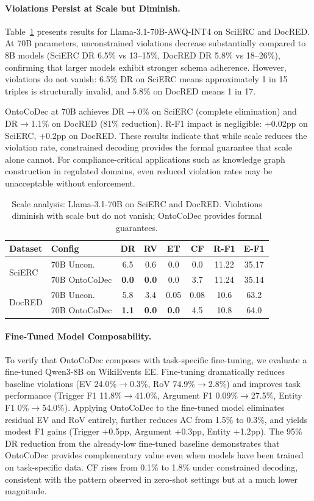 \documentclass[11pt,a4paper]{article}
\newcommand{\sys}{OntoCoDec}
\newcommand{\bfval}[1]{\textbf{#1}}
\begin{document}
\paragraph{Violations Persist at Scale but Diminish.}
Table~\ref{tab:70b} presents results for Llama-3.1-70B-AWQ-INT4 on SciERC and DocRED. At 70B parameters, unconstrained violations decrease substantially compared to 8B models (SciERC DR 6.5\% vs 13--15\%, DocRED DR 5.8\% vs 18--26\%), confirming that larger models exhibit stronger schema adherence. However, violations do not vanish: 6.5\% DR on SciERC means approximately 1 in 15 triples is structurally invalid, and 5.8\% on DocRED means 1 in 17.

\sys{} at 70B achieves DR$\to$0\% on SciERC (complete elimination) and DR$\to$1.1\% on DocRED (81\% reduction). R-F1 impact is negligible: +0.02pp on SciERC, +0.2pp on DocRED. These results indicate that while scale reduces the violation rate, constrained decoding provides the formal guarantee that scale alone cannot. For compliance-critical applications such as knowledge graph construction in regulated domains, even reduced violation rates may be unacceptable without enforcement.

\begin{table}[t]
\centering
\small
\caption{Scale analysis: Llama-3.1-70B on SciERC and DocRED. Violations diminish with scale but do not vanish; \sys{} provides formal guarantees.}
\label{tab:70b}
\begin{tabular}{llcccccc}
\toprule
Dataset & Config & DR & RV & ET & CF & R-F1 & E-F1 \\
\midrule
\multirow{2}{*}{SciERC} & 70B Uncon. & 6.5 & 0.6 & 0.0 & 0.0 & 11.22 & 35.17 \\
& 70B \sys{} & \bfval{0.0} & \bfval{0.0} & 0.0 & 3.7 & 11.24 & 35.14 \\
\midrule
\multirow{2}{*}{DocRED} & 70B Uncon. & 5.8 & 3.4 & 0.05 & 0.08 & 10.6 & 63.2 \\
& 70B \sys{} & \bfval{1.1} & \bfval{0.0} & \bfval{0.0} & 4.5 & 10.8 & 64.0 \\
\bottomrule
\end{tabular}
\end{table}

\paragraph{Fine-Tuned Model Composability.}
To verify that \sys{} composes with task-specific fine-tuning, we evaluate a fine-tuned Qwen3-8B on WikiEvents EE. Fine-tuning dramatically reduces baseline violations (EV 24.0\%$\to$0.3\%, RoV 74.9\%$\to$2.8\%) and improves task performance (Trigger F1 11.8\%$\to$41.0\%, Argument F1 0.09\%$\to$27.5\%, Entity F1 0\%$\to$54.0\%). Applying \sys{} to the fine-tuned model eliminates residual EV and RoV entirely, further reduces AC from 1.5\% to 0.3\%, and yields modest F1 gains (Trigger +0.5pp, Argument +0.3pp, Entity +1.2pp). The 95\% DR reduction from the already-low fine-tuned baseline demonstrates that \sys{} provides complementary value even when models have been trained on task-specific data. CF rises from 0.1\% to 1.8\% under constrained decoding, consistent with the pattern observed in zero-shot settings but at a much lower magnitude.
\end{document}
